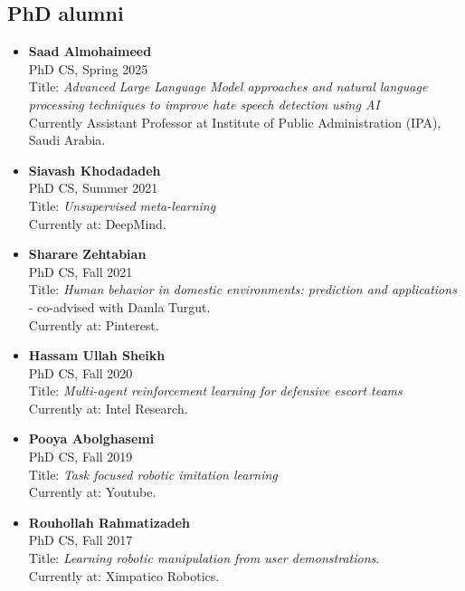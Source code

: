 \subsection*{PhD alumni}
    
\begin{itemize}

\item\textbf{Saad Almohaimeed} \\
    PhD CS, Spring 2025 \\
    Title: \emph{Advanced Large Language Model approaches and natural language processing techniques to improve hate speech detection using AI} \\
    Currently Assistant Professor at Institute of Public Administration (IPA), Saudi Arabia.

\item\textbf{Siavash Khodadadeh} \\
      PhD CS, Summer 2021 \\ %
      Title: \emph{Unsupervised meta-learning} \\
    Currently at: DeepMind.

\item\textbf{Sharare Zehtabian} \\
      PhD CS, Fall 2021 \\
      Title: \emph{Human behavior in domestic environments: prediction and applications} - co-advised with Damla Turgut. \\
    Currently at: Pinterest.

\item\textbf{Hassam Ullah Sheikh} \\
      PhD CS, Fall 2020 \\ %
      Title: \emph{Multi-agent reinforcement learning for defensive escort teams} \\
      Currently at: Intel Research.

\item\textbf{Pooya Abolghasemi} \\
      PhD CS,  Fall 2019 \\  %
      Title: \emph{Task focused robotic imitation learning} \\
      Currently at: Youtube.

\item\textbf{Rouhollah Rahmatizadeh} \\
      PhD CS, Fall 2017 \\
      Title: \emph{Learning robotic manipulation from user demonstrations}. \\
      Currently at: Ximpatico Robotics.   


\end{itemize}
